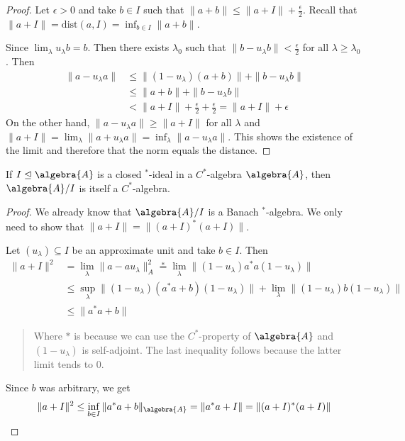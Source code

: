 \documentclass[a4paper]{article}
\begin{document}
\begin{proof}
	Let $\epsilon > 0$ and take $b \in I$ such that $\|a + b\| \leq \|a + I \| + \frac{\epsilon}{2}$.
	Recall that $\|a + I\| = \mathrm{dist}(a, I) = \inf_{b \in I} \|a + b\|$.

	Since $\lim_\lambda u_\lambda b = b$.
	Then there exists $\lambda_0$ such that $\|b - u_\lambda b\| < \frac{\epsilon}{2}$ for all $\lambda \geq \lambda_0$. 
	Then 
	\begin{align*}
		\|a - u_\lambda a\|
		&\leq \| (1 - u_\lambda) (a + b) \| + \|b - u_\lambda b\| \\
		&\leq \|a + b\| + \|b - u_\lambda b\| \\
		&< \|a + I\| + \frac{\epsilon}{2} + \frac{\epsilon}{2} = \|a + I\| + \epsilon
	\end{align*}
	On the other hand, $\|a - u_\lambda a\| \geq \|a + I\|$ for all $\lambda$ and $\|a + I\| = \lim_\lambda \|a + u_\lambda a\| = \inf_\lambda \|a - u_\lambda a\|$.
	This shows the existence of the limit and therefore that the norm equals the distance.
\end{proof}

\begin{theorem}
	If $I \trianglelefteq \algebra{A}$ is a closed $^*$-ideal in a $C^*$-algebra $\algebra{A}$, then $\algebra{A}/I$ is itself a $C^*$-algebra.
\end{theorem}

\begin{proof}
	We already know that $\algebra{A}/I$ is a Banach $^*$-algebra. We only need to show that $\|a + I\| = \| (a + I)^* (a + I)\|$.

	Let $(u_\lambda) \subseteq I$ be an approximate unit and take $b \in I$. Then
	\begin{align*}
		\|a + I\|^2 &= \lim_{\lambda} \|a - a u_\lambda\|_A^2  \overset{*}{=} \lim_\lambda \|(1 - u_\lambda) a^* a (1 - u_\lambda)\|\\
		&\leq \sup_\lambda  \|(1 - u_\lambda) (a^* a + b) (1 - u_\lambda) \| + \lim_\lambda \|(1 - u_\lambda) b (1 - u_\lambda)\| \\
		&\leq \|a^* a + b\|
	\end{align*}
	\begin{quote}
		Where $*$ is because we can use the $C^*$-property of $\algebra{A}$ and $(1 - u_\lambda)$ is self-adjoint.
		The last inequality follows because the latter limit tends to $0$.
	\end{quote}
	Since $b$ was arbitrary, we get
	\begin{equation*}
		\|a + I \|^2 \leq \inf_{b \in I} \|a^* a + b\|_\algebra{A} = \|a^* a + I \| = \|(a + I)^* (a + I) \|
	\end{equation*}
\end{proof}
\end{document}
